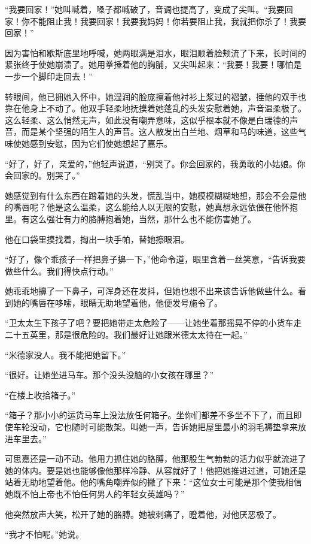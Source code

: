 \par “我要回家！”她叫喊着，嗓子都喊破了，音调也提高了，变成了尖叫。“我要回家！你不能阻止我！我要回家！我要我妈妈！你若要阻止我，我就把你杀了！我要回家！”
\par 因为害怕和歇斯底里地呼喊，她两眼满是泪水，眼泪顺着脸颊流了下来，长时间的紧张终于使她崩溃了。她用拳捶着他的胸脯，又尖叫起来：“我要！我要！哪怕是一步一个脚印走回去！”
\par 转眼间，他已拥她入怀中，她湿润的脸庞擦着他衬衫上浆过的褶皱，捶他的双手也靠在他身上不动了。他双手轻柔地抚摸着她蓬乱的头发安慰着她，声音温柔极了。这么轻柔、这么悄然无声，如此没有嘲弄意味，这似乎根本就不像是白瑞德的声音，而是某个坚强的陌生人的声音。这人散发出白兰地、烟草和马的味道，这些气味使她感到安慰，因为它们使她想起了嘉乐。
\par “好了，好了，亲爱的，”他轻声说道，“别哭了。你会回家的，我勇敢的小姑娘。你会回家的。别哭了。”
\par 她感觉到有什么东西在蹭着她的头发，慌乱当中，她模模糊糊地想，那会不会是他的嘴唇呢？他是这么温柔，这么能给人以无限的安慰，她真想永远依偎在他怀抱里。有这么强壮有力的胳膊抱着她，当然，那什么也不能伤害她了。
\par 他在口袋里摸找着，掏出一块手帕，替她擦眼泪。
\par “好了，像个乖孩子一样把鼻子擤一下，”他命令道，眼里含着一丝笑意，“告诉我要做些什么。我们得快点行动。”
\par 她乖乖地擤了一下鼻子，可浑身还在发抖，但她也想不出来该告诉他做些什么。看到她的嘴唇在哆嗦，眼睛无助地望着他，他便发号施令了。
\par “卫太太生下孩子了吧？要把她带走太危险了——让她坐着那摇晃不停的小货车走二十五英里，那是很危险的。我们最好让她跟米德太太待在一起。”
\par “米德家没人。我不能把她留下。”
\par “很好。让她坐进马车。那个没头没脑的小女孩在哪里？”
\par “在楼上收拾箱子。”
\par “箱子？那小小的运货马车上没法放任何箱子。坐你们都差不多坐不下了，而且即使车轮没动，它也随时可能散架。叫她一声，告诉她把屋里最小的羽毛褥垫拿来放进车里去。”
\par 可思嘉还是一动不动。他用力抓住她的胳膊，他那股生气勃勃的活力似乎就流进了她的体内。要是她也能够像他那样冷静、从容就好了！他把她推进过道，可她还是站着无助地望着他。他的嘴角嘲弄似的撇了下来：“这位女士可能是那个使我相信她既不怕上帝也不怕任何男人的年轻女英雄吗？”
\par 他突然放声大笑，松开了她的胳膊。她被刺痛了，瞪着他，对他厌恶极了。
\par “我才不怕呢。”她说。
